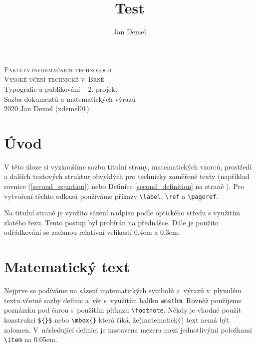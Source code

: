\documentclass[a4paper, 11pt, twocolumn]{article}
\theoremstyle{definition}
\begin{document}
\title{Test}
\author{Jan Demel}

\begin{titlepage}
    \begin{center}
        {\Huge\textsc{
            Fakulta informačních technologií\\
            Vysoké učení technické v~Brně\\
        }}
		{\LARGE
			Typografie a publikování – 2. projekt \\
			Sazba dokumentů a matematických výrazů\\
		}
		{\Large
			2020
			\hfill
			Jan Demel (xdemel01)
		}
    \end{center}
\end{titlepage}

\section*{Úvod}
V této úloze si vyzkoušíme sazbu titulní strany, matematic\-kých vzorců, prostředí a dalších textových struktur obvyklých pro technicky zaměřené texty (například rovnice (\ref{second_equation}) nebo Definice \ref{second_definition} na straně \pageref{second_definition}). Pro vytvoření těchto odkazů používáme příkazy \verb|\label|, \verb|\ref| a \verb|\pageref|.

Na titulní straně je využito sázení nadpisu podle optického středu s využitím zlatého řezu. Tento postup byl
probírán na přednášce. Dále je použito odřádkování se
zadanou relativní velikostí 0.4em a 0.3em.

\section{Matematický text}
Nejprve se podíváme na sázení matematických symbolů
a~výrazů v~plynulém textu včetně sazby definic a~vět s~využitím balíku \verb|amsthm|. Rovněž použijeme poznámku pod čarou s~použitím příkazu \verb|\footnote|. Někdy je vhodné použít konstrukci \verb|${}$| nebo \verb|\mbox{}| která říká, že\linebreak(matematický) text nemá být zalomen. V~následující definici je nastavena mezera mezi jednotlivými položkami
\verb|\item| na 0.05em.
\end{document}
